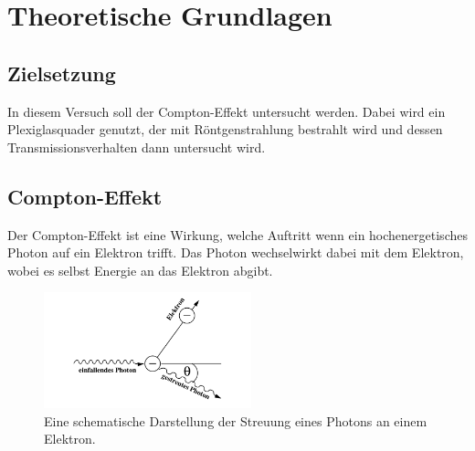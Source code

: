 \newpage
\section{Theoretische Grundlagen}

\subsection{Zielsetzung}

\noindent
In diesem Versuch soll der Compton-Effekt untersucht werden. 
Dabei wird ein Plexiglasquader genutzt, der mit Röntgenstrahlung bestrahlt wird und dessen Transmissionsverhalten dann untersucht wird.

\subsection{Compton-Effekt}

\noindent
Der Compton-Effekt ist eine Wirkung, welche Auftritt wenn ein hochenergetisches Photon auf ein Elektron trifft. 
Das Photon wechselwirkt dabei mit dem Elektron, wobei es selbst Energie an das Elektron abgibt.

\begin{figure}
    \centering
    \includegraphics[width=6cm]{latex/images/Compton.PNG}
    \caption{Eine schematische Darstellung der Streuung eines Photons an einem Elektron\protect \cite{354}.}
    \label{img:comp}
\end{figure}

